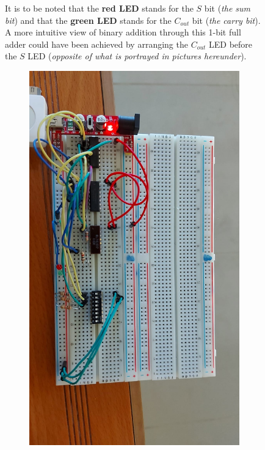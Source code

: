 \documentclass[a4paper]{article}
\begin{document}
\begin{figure}
     \centering
     It is to be noted that the \textbf{red LED} stands for the $S$ bit (\textit{the sum bit}) and that the \textbf{green LED} stands for the $C_{out}$ bit (\textit{the carry bit}). A more intuitive view of binary addition through this 1-bit full adder could have been achieved by arranging the $C_{out}$ LED before the $S$ LED (\emph{opposite of what is portrayed in pictures hereunder}).\vspace{1em}
     \begin{subfigure}[b]{0.9\textwidth}
         \centering
        \includegraphics[angle=90, width=\textwidth]{alloff.jpeg}

\end{subfigure}
\end{figure}
\end{document}
